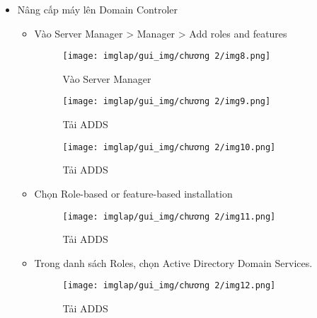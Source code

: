 \documentclass[13pt]{article}
\begin{document}
                \begin{itemize}
                    \item Nâng cấp máy lên Domain Controler
                        \begin{itemize}
                            \item Vào Server Manager > Manager > Add roles and features

                            \begin{figure}[H]
                                \centering
                                \texttt{[image: imglap/gui\_img/chương 2/img8.png]}
                                \caption{Vào Server Manager}
                                \label{fig:enter-label}
                            \end{figure}

                            \begin{figure}[H]
                                \centering
                                \texttt{[image: imglap/gui\_img/chương 2/img9.png]}
                                \caption{Tải ADDS}
                                \label{fig:enter-label}
                            \end{figure}

                            \begin{figure}[H]
                                \centering
                                \texttt{[image: imglap/gui\_img/chương 2/img10.png]}
                                \caption{Tải ADDS}
                                \label{fig:enter-label}
                            \end{figure}

                            \item Chọn Role-based or feature-based installation
                            \begin{figure}[H]
                                \centering
                                \texttt{[image: imglap/gui\_img/chương 2/img11.png]}
                                \caption{Tải ADDS}
                                \label{fig:enter-label}
                            \end{figure}
                            \newpage
                            \item Trong danh sách Roles, chọn Active Directory Domain Services.

                            \begin{figure}[H]
                                \centering
                                \texttt{[image: imglap/gui\_img/chương 2/img12.png]}
                                \caption{Tải ADDS}
                                \label{fig:enter-label}
                            \end{figure}


\end{itemize}
\end{itemize}
\end{document}
